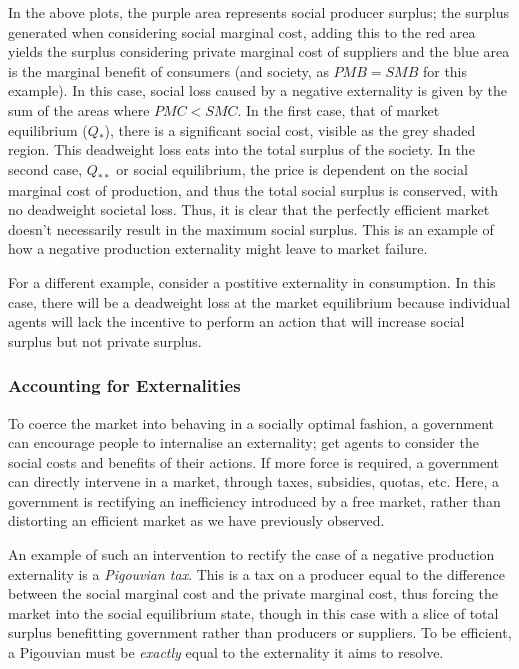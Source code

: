 \documentclass[12pt]{report}
\begin{document}
\begin{flushleft}
In the above plots, the purple area represents social producer surplus;
the surplus generated when considering social marginal cost, adding this to
the red area yields the surplus considering private marginal cost of 
suppliers and the blue area is the marginal benefit of consumers (and 
society, as \(PMB = SMB\) for this example). In this case, social loss 
caused by a negative externality is given by the sum of the areas where
\(PMC < SMC\). In the first case, that of market equilibrium (\(Q_*\)),
there is a significant social cost, visible as the grey shaded region.
This deadweight loss eats into the total surplus of the society.
In the second case, \(Q_{**}\) or social equilibrium, the price is 
dependent on the social marginal cost of production, and thus the total
social surplus is conserved, with no deadweight societal loss.
Thus, it is clear that the perfectly efficient market doesn't necessarily
result in the maximum social surplus. This is an example of how a negative
production externality might leave to market failure.

\bigskip
For a different example, consider a postitive externality in consumption.
In this case, there will be a deadweight loss at the market equilibrium
because individual agents will lack the incentive to perform an action
that will increase social surplus but not private surplus.

\subsubsection*{Accounting for Externalities}
To coerce the market into behaving in a socially optimal fashion, a
government can encourage people to internalise an externality; get
agents to consider the social costs and benefits of their actions.
If more force is required, a government can directly intervene in a
market, through taxes, subsidies, quotas, etc. Here, a government
is rectifying an inefficiency introduced by a free market, rather
than distorting an efficient market as we have previously observed.

\bigskip
An example of such an intervention to rectify the case of a negative
production externality is a \textit{Pigouvian tax}. This is a tax on
a producer equal to the difference between the social marginal cost
and the private marginal cost, thus forcing the market into the
social equilibrium state, though in this case with a slice of total
surplus benefitting government rather than producers or suppliers.
To be efficient, a Pigouvian must be \textit{exactly} equal to the
externality it aims to resolve.


\end{flushleft}
\end{document}
